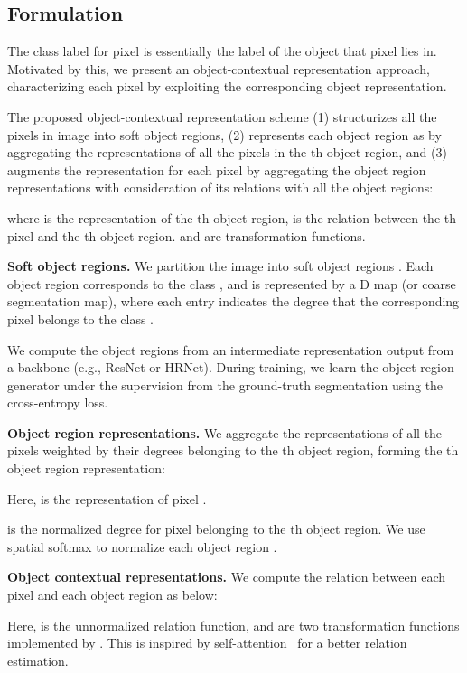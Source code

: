 \documentclass[runningheads]{llncs}
\begin{document}
\subsection{Formulation}
\label{sec:formulation}

The class label  for pixel  is essentially 
the label of the object that pixel  lies in.
Motivated by this,
we present an object-contextual representation approach,
characterizing each pixel by exploiting the corresponding object representation.

The proposed object-contextual representation scheme
(1) structurizes all the pixels in image 
into  soft object regions,
(2) represents each object region 
as 
by aggregating the representations
of all the pixels in the th object region,
and (3) augments the representation
for each pixel
by aggregating the  object region representations
with consideration of its relations
with all the object regions:

where  is the representation
of the th object region,
 is the relation
between the th pixel
and the th object region.
 and  
are transformation functions.

\noindent\textbf{Soft object regions.}
We partition the image  into  soft 
object regions 
.
Each object region  corresponds to the class ,
and is represented by a D map (or coarse segmentation map), where each entry indicates 
the degree that the corresponding pixel belongs 
to the class .

We compute the  object regions
from an intermediate representation output
from a backbone
(e.g., ResNet or HRNet).
During training,
we learn the object region generator
under the supervision 
from the ground-truth segmentation
using the cross-entropy loss.

\noindent\textbf{Object region representations.}
We aggregate
the representations of all the pixels weighted
by their degrees belonging to the th object region,
forming the th object region representation:

Here,  is the representation of pixel .
 
is the normalized degree for pixel  belonging to the th object region.
We use spatial softmax to normalize
each object region .


\noindent\textbf{Object contextual representations.}
We compute the relation between each pixel and each object region as below:

Here, 
is the unnormalized relation function,
 and 
are two transformation functions implemented by
.
This is inspired by self-attention~\cite{vaswani2017attention}
for a better relation estimation.
\end{document}
